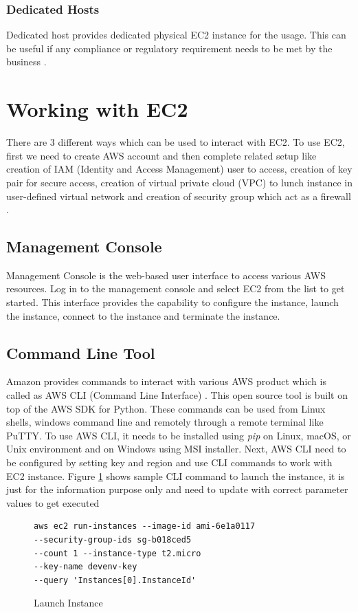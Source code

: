 \subsubsection{Dedicated Hosts} 
Dedicated host provides dedicated physical EC2 instance for the usage. This can be useful if any compliance or regulatory requirement needs to be met by the business \cite{www-aws-ec2Pricing}.

\section{Working with EC2}
There are 3 different ways which can be used to interact with EC2. To use EC2, first we need to create AWS account and then complete related setup like creation of IAM (Identity and Access Management) user to access, creation of key pair for secure access, creation of virtual private cloud (VPC) to lunch instance in user-defined virtual network and creation of security group which act as a firewall \cite{www-aws-ec2-setup}.

\subsection{Management Console}
Management Console \cite{www-aws-ec2-gettingStarted} is the web-based user interface to access various AWS resources. Log in to the management console and select EC2 from the list to get started. This interface provides the capability to configure the instance, launch the instance, connect to the instance and terminate the instance.

\subsection{Command Line Tool}
Amazon provides commands to interact with various AWS product which is called as AWS CLI (Command Line Interface) \cite{www-aws-ec2-cli}. This open source tool is built on top of the AWS SDK for Python. These commands can be used from Linux shells, windows command line and remotely through a remote terminal like PuTTY. To use AWS CLI, it needs to be installed using \emph{pip} on Linux, macOS, or Unix environment and on Windows using MSI installer. Next, AWS CLI need to be configured by setting key and region and use CLI commands to work with EC2 instance.
Figure \ref{c:cli-launch} shows sample CLI command to launch the instance, it is just for the information purpose only and need to update with correct parameter values to get executed
\begin{figure}[htb]
\begin{verbatim}
aws ec2 run-instances --image-id ami-6e1a0117
--security-group-ids sg-b018ced5 
--count 1 --instance-type t2.micro 
--key-name devenv-key 
--query 'Instances[0].InstanceId'
\end{verbatim}
\caption{Launch Instance \cite{www-aws-ec2-cli}}\label{c:cli-launch}
\end{figure}

